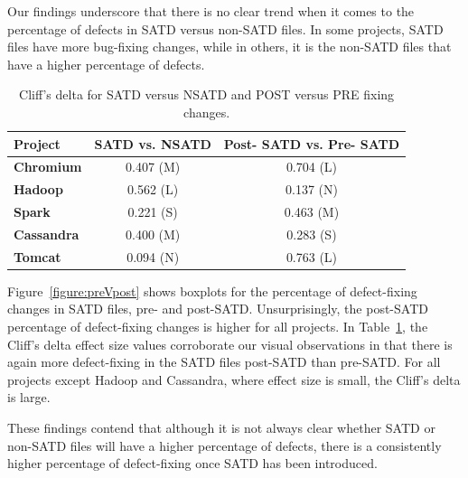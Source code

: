 Our findings underscore that there is no clear trend when it comes to the percentage of defects in SATD versus non-SATD files. In some projects, SATD files have more bug-fixing changes, while in others, it is the non-SATD files that have a higher percentage of defects.

\begin{table}[tb]
	\setlength{\tabcolsep}{.7\tabcolsep}
	\centering
	\caption{Cliff's delta for SATD versus NSATD and POST versus PRE fixing changes.}
	\begin{tabular}{l|c|c}
		\hline
		\textbf{Project}   & {\bf SATD vs. NSATD} & {\bf Post- SATD vs. Pre- SATD} \\ \hline
		\textbf{Chromium}  & 0.407 (M)          & 0.704 (L)        \\ \hline
		\textbf{Hadoop}    & 0.562 (L)        & 0.137 (N)        \\ \hline
		\textbf{Spark}     & 0.221 (S)         & 0.463 (M)        \\ \hline
		\textbf{Cassandra} & 0.400 (M)        & 0.283 (S)       \\ \hline
		\textbf{Tomcat}    & 0.094  (N)        & 0.763  (L)      \\ \hline
	\end{tabular}
	\label{table:cliff_deltas_RQ1}
\end{table}

 Figure~\ref{figure:preVpost} shows boxplots for the percentage of defect-fixing changes in SATD files, pre- and post-SATD. Unsurprisingly, the post-SATD percentage of defect-fixing changes is higher for all projects. In Table~\ref{table:cliff_deltas_RQ1}, the Cliff's delta effect size values corroborate our visual observations in that there is again more defect-fixing in the SATD files post-SATD than pre-SATD. For all projects except Hadoop and Cassandra, where effect size is small, the Cliff's delta is large.


These findings contend that although it is not always clear whether SATD or non-SATD files will have a higher percentage of defects, there is a consistently higher percentage of defect-fixing once SATD has been introduced.



